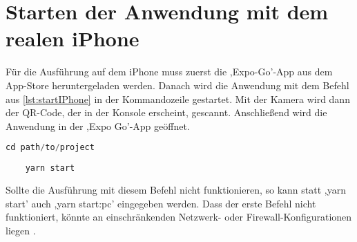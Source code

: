 \section{Starten der Anwendung mit dem realen iPhone}
Für die Ausführung auf dem iPhone muss zuerst die ,Expo-Go'-App aus dem App-Store heruntergeladen werden. Danach wird die Anwendung mit dem Befehl aus \autoref{lst:startIPhone} in der Kommandozeile gestartet. Mit der Kamera wird dann der QR-Code, der in der Konsole erscheint, gescannt. Anschließend wird die Anwendung in der ,Expo Go'-App geöffnet.
\begin{lstlisting}[caption={Nachdem die ,Expo Go'-App im App-Store heruntergeladen wurde, kann mit der Ausführung dieser Befehle in der Kommandozeile die Anwendung gestartet werden. Anschließend wird der nun in der Konsole angezeigte QR-Code mit der iPhone-Kamera gescannt. Dann öffnet sich die Anwendung in der ,Expo Go'-App.},captionpos=b, language=Java, label=lst:startIPhone]
	cd path/to/project
	
	yarn start
\end{lstlisting}
Sollte die Ausführung mit diesem Befehl nicht funktionieren, so kann statt ,yarn start' auch ,yarn start:pc' eingegeben werden. Dass der erste Befehl nicht funktioniert, könnte an einschränkenden Netzwerk- oder Firewall-Konfigurationen liegen \cite{tunneling}.